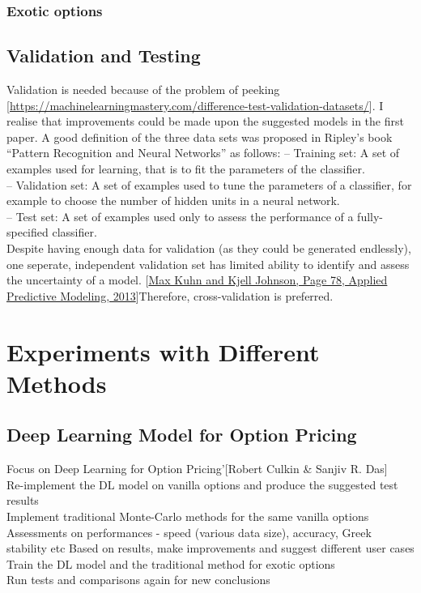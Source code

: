\documentclass{report}
\begin{document}
\subsection{Exotic options}
\section{Validation and Testing}
Validation is needed because of the problem of peeking [\url{https://machinelearningmastery.com/difference-test-validation-datasets/}]. I realise that improvements could be made upon the suggested models in the first paper. 
A good definition of the three data sets was proposed in Ripley’s book “Pattern Recognition and Neural Networks” as follows:
– Training set: A set of examples used for learning, that is to fit the parameters of the classifier.\\
– Validation set: A set of examples used to tune the parameters of a classifier, for example to choose the number of hidden units in a neural network.\\
– Test set: A set of examples used only to assess the performance of a fully-specified classifier.\\
Despite having enough data for validation (as they could be generated endlessly), one seperate, independent validation set has limited ability to identify and assess the uncertainty of a model. [\url{Max Kuhn and Kjell Johnson, Page 78, Applied Predictive Modeling, 2013}]Therefore, cross-validation is preferred.


\chapter{Experiments with Different Methods}

\section{Deep Learning Model for Option Pricing}
Focus on Deep Learning for Option Pricing’[Robert Culkin & Sanjiv R. Das]\\
Re-implement the DL model on vanilla options and produce the suggested test results\\
Implement traditional Monte-Carlo methods for the same vanilla options \\
Assessments on performances - speed (various data size), accuracy, Greek stability etc
Based on results, make improvements and suggest different user cases\\
Train the DL model and the traditional method for exotic options\\
Run tests and comparisons again for new conclusions
\end{document}
